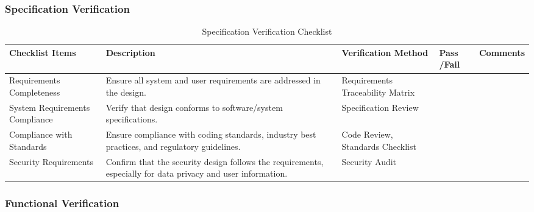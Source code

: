 \documentclass[12pt, titlepage]{article}
\begin{document}
\subsubsection{Specification Verification}

\begin{table}[h!]
\caption{Specification Verification Checklist}
\noindent \begin{tabular}{|>{\raggedright\arraybackslash}p{3cm}|>{\raggedright\arraybackslash}p{4cm}|>{\raggedright\arraybackslash}p{3cm}|p{1cm}|p{2.25cm}|}
	\hline
	\textbf{Checklist Items} & \textbf{Description} & \textbf{Verification Method} & \textbf{Pass /Fail} & \textbf{Comments} \\ 
	\hline
	Requirements Completeness & Ensure all system and user requirements are addressed in the design. & Requirements Traceability Matrix & & \\
	\hline
	System Requirements Compliance & Verify that design conforms to software/system specifications. & Specification Review	& & \\
	\hline
	Compliance with Standards & Ensure compliance with coding standards, industry best practices, and regulatory guidelines. & Code Review, Standards Checklist	& & \\
	\hline
	Security Requirements & Confirm that the security design follows the requirements, especially for data privacy and user information. & Security Audit & & \\
	\hline
\end{tabular}
\end{table}

\newpage

\subsubsection{Functional Verification}
\end{document}
